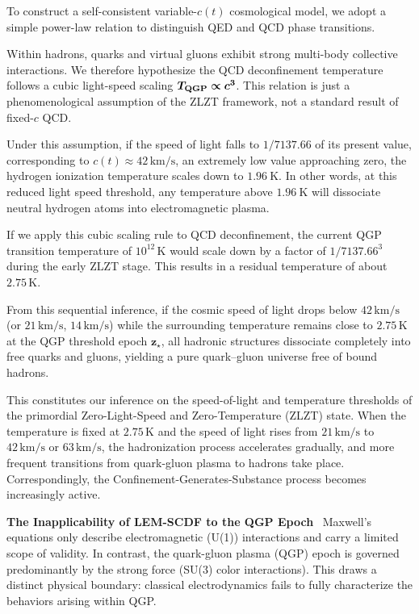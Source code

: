 \documentclass[12pt,leqno]{article}
\begin{document}
{	\medskip
	To construct a self-consistent variable-$c(t)$ cosmological model, we adopt a simple power-law relation to distinguish QED and QCD phase transitions. 
	
	\medskip
	Within hadrons, quarks and virtual gluons exhibit strong multi-body collective interactions. We therefore hypothesize the QCD deconfinement temperature follows a cubic light-speed scaling $\boldsymbol{T_{\rm QGP} \propto c^3}$. This relation is just a phenomenological assumption of the ZLZT framework, not a standard result of fixed-$c$ QCD.
	
	\medskip
	Under this assumption, if the speed of light falls to $1/7137.66$ of its present value, corresponding to $c(t) \approx 42\,\mathrm{km/s}$, an extremely low value approaching zero, the hydrogen ionization temperature scales down to $1.96\ \mathrm{K}$. In other words, at this reduced light speed threshold, any temperature above $1.96\ \mathrm{K}$ will dissociate neutral hydrogen atoms into electromagnetic plasma.
	
	\medskip
	If we apply this cubic scaling rule to QCD deconfinement, the current QGP transition temperature of $10^{12}\,\mathrm{K}$ would scale down by a factor of $1/7137.66^3$ during the early ZLZT stage. This results in a residual temperature of about $2.75\,\mathrm{K}$. 
	
	\medskip
	From this sequential inference, if the cosmic speed of light drops below $42\,\mathrm{km/s}$ (or $21\,\mathrm{km/s}$, $14\,\mathrm{km/s}$) while the surrounding temperature remains close to $2.75\,\mathrm{K}$ at the QGP threshold epoch $\boldsymbol{z_{\star}}$, all hadronic structures dissociate completely into free quarks and gluons, yielding a pure quark–gluon universe free of bound hadrons. 
	
	\medskip
	This constitutes our inference on the speed-of-light and temperature thresholds of the primordial Zero-Light-Speed and Zero-Temperature (ZLZT) state. When the temperature is fixed at $2.75\,\mathrm{K}$ and the speed of light rises from $21\,\mathrm{km/s}$ to $42\,\mathrm{km/s}$ or $63\,\mathrm{km/s}$, the hadronization process accelerates gradually, and more frequent transitions from quark-gluon plasma to hadrons take place. Correspondingly, the Confinement-Generates-Substance process becomes increasingly active.
	
	
	
	\medskip
	\bigskip
	\textbf{The Inapplicability of LEM-SCDF to the QGP Epoch}\,\,\,
	Maxwell’s equations only describe electromagnetic (U(1)) interactions and carry a limited scope of validity. In contrast, the quark-gluon plasma (QGP) epoch is governed predominantly by the strong force (SU(3) color interactions). This draws a distinct physical boundary: classical electrodynamics fails to fully characterize the behaviors arising within QGP.
	
}
\end{document}
